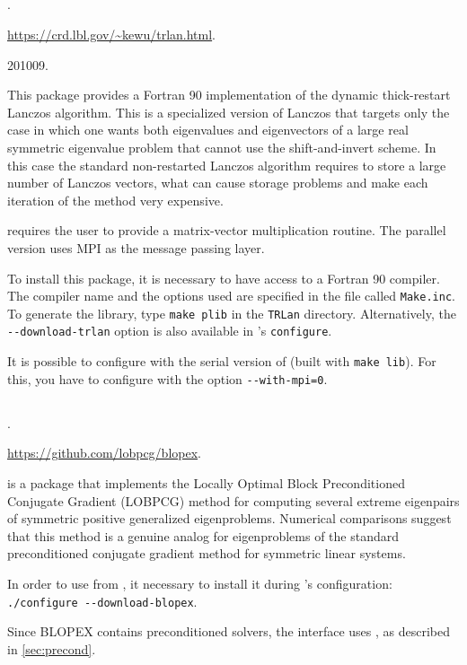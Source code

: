 \subsection*{\underline{\trlan}}
	\begin{description}
	\setlength{\itemsep}{0pt}
	\item[References.]\citep{Wu:2000:TLM}.
	\item[Website.] \url{https://crd.lbl.gov/\~kewu/trlan.html}.
	\item[Version.] 201009.
	\item[Summary.] This package provides a Fortran 90 implementation of the dynamic thick-restart Lanczos algorithm. This is a specialized version of Lanczos that targets only the case in which one wants both eigenvalues and eigenvectors of a large real symmetric eigenvalue problem that cannot use the shift-and-invert scheme. In this case the standard non-restarted Lanczos algorithm requires to store a large number of Lanczos vectors, what can cause storage problems and make each iteration of the method very expensive.

	\trlan{} requires the user to provide a matrix-vector multiplication routine. The parallel version uses MPI as the message passing layer.
	\item[Installation.] To install this package, it is necessary to have access to a Fortran 90 compiler. The compiler name and the options used are specified in the file called \texttt{Make.inc}. To generate the library, type \texttt{make plib} in the \texttt{TRLan} directory. Alternatively, the \texttt{-{}-download-trlan} option is also available in \slepc's \texttt{configure}.

	It is possible to configure \slepc with the serial version of \trlan (built with \texttt{make lib}). For this, you have to configure \petsc with the option \texttt{-{}-with-mpi=0}.
	\end{description}

\subsection*{\underline{\blopex}}
	\begin{description}
	\setlength{\itemsep}{0pt}
	\item[References.]\citep{Knyazev:2007:BLO}.
	\item[Website.] \url{https://github.com/lobpcg/blopex}.
	\item[Summary.] \blopex is a package that implements the Locally Optimal Block Preconditioned Conjugate Gradient (LOBPCG) method for computing several extreme eigenpairs of symmetric positive generalized eigenproblems. Numerical comparisons suggest that this method is a genuine analog for eigenproblems of the standard preconditioned conjugate gradient method for symmetric linear systems.
	\item[Installation.] In order to use \blopex from \slepc, it necessary to install it during \slepc's configuration: \Verb!./configure --download-blopex!.
	\item[Specific options.] Since BLOPEX contains preconditioned solvers, the \slepc interface uses , as described in \ref{sec:precond}.
	\end{description}

